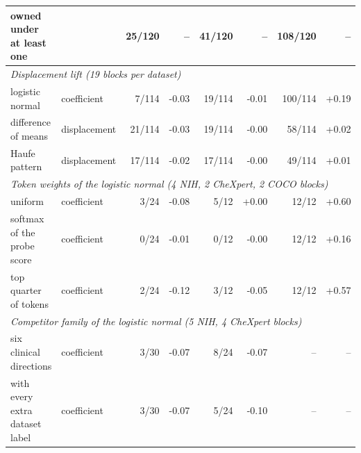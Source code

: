 \documentclass{article}
\providecommand{\DIFaddendFL}{} %
\DeclareRobustCommand{\DIFaddendFL}{\DIFOaddendFL \let\includegraphics\DIFOincludegraphics} %
\begin{document}
\begin{table}[h]
{\begin{tabular}{llrrrrrr}
\quad owned under at least one &  & 25/120 & -- & 41/120 & -- & 108/120 & -- \\
\midrule
\multicolumn{8}{l}{\textit{Displacement lift (19 blocks per dataset)}} \\
\quad logistic normal & coefficient & 7/114 & -0.03 & 19/114 & -0.01 & 100/114 & +0.19 \\
\quad difference of means & displacement & 21/114 & -0.03 & 19/114 & -0.00 & 58/114 & +0.02 \\
\quad Haufe pattern & displacement & 17/114 & -0.02 & 17/114 & -0.00 & 49/114 & +0.01 \\
\midrule
\multicolumn{8}{l}{\textit{Token weights of the logistic normal (4 NIH, 2 CheXpert, 2 COCO blocks)}} \\
\quad uniform & coefficient & 3/24 & -0.08 & 5/12 & +0.00 & 12/12 & +0.60 \\
\quad softmax of the probe score & coefficient & 0/24 & -0.01 & 0/12 & -0.00 & 12/12 & +0.16 \\
\quad top quarter of tokens & coefficient & 2/24 & -0.12 & 3/12 & -0.05 & 12/12 & +0.57 \\
\midrule
\multicolumn{8}{l}{\textit{Competitor family of the logistic normal (5 NIH, 4 CheXpert blocks)}} \\
\quad six clinical directions & coefficient & 3/30 & -0.07 & 8/24 & -0.07 & -- & -- \\
\quad with every extra dataset label & coefficient & 3/30 & -0.07 & 5/24 & -0.10 & -- & -- \\
\bottomrule
\end{tabular}}
\DIFaddendFL \end{table}
\end{document}
